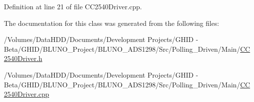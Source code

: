 \-Definition at line 21 of file \-C\-C2540\-Driver.\-cpp.



\-The documentation for this class was generated from the following files\-:\begin{DoxyCompactItemize}
\item 
/\-Volumes/\-Data\-H\-D\-D/\-Documents/\-Development Projects/\-G\-H\-I\-D -\/ Beta/\-G\-H\-I\-D/\-B\-L\-U\-N\-O\-\_\-\-Project/\-B\-L\-U\-N\-O\-\_\-\-A\-D\-S1298/\-Src/\-Polling\-\_\-\-Driven/\-Main/\hyperlink{_c_c2540_driver_8h}{\-C\-C2540\-Driver.\-h}\item 
/\-Volumes/\-Data\-H\-D\-D/\-Documents/\-Development Projects/\-G\-H\-I\-D -\/ Beta/\-G\-H\-I\-D/\-B\-L\-U\-N\-O\-\_\-\-Project/\-B\-L\-U\-N\-O\-\_\-\-A\-D\-S1298/\-Src/\-Polling\-\_\-\-Driven/\-Main/\hyperlink{_c_c2540_driver_8cpp}{\-C\-C2540\-Driver.\-cpp}\end{DoxyCompactItemize}
